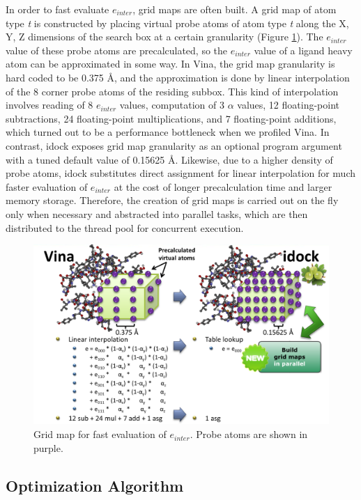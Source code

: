 In order to fast evaluate $e_{inter}$, grid maps are often built. A grid map of atom type \textit{t} is constructed by placing virtual probe atoms of atom type \textit{t} along the X, Y, Z dimensions of the search box at a certain granularity (Figure \ref{idock:GridMap}). The $e_{inter}$ value of these probe atoms are precalculated, so the $e_{inter}$ value of a ligand heavy atom can be approximated in some way. In Vina, the grid map granularity is hard coded to be 0.375 \AA, and the approximation is done by linear interpolation of the 8 corner probe atoms of the residing subbox. This kind of interpolation involves reading of 8 $e_{inter}$ values, computation of 3 $\alpha$ values, 12 floating-point subtractions, 24 floating-point multiplications, and 7 floating-point additions, which turned out to be a performance bottleneck when we profiled Vina. In contrast, idock exposes grid map granularity as an optional program argument with a tuned default value of 0.15625 \AA. Likewise, due to a higher density of probe atoms, idock substitutes direct assignment for linear interpolation for much faster evaluation of $e_{inter}$ at the cost of longer precalculation time and larger memory storage. Therefore, the creation of grid maps is carried out on the fly only when necessary and abstracted into parallel tasks, which are then distributed to the thread pool for concurrent execution.

\begin{figure}
\centering
\includegraphics[width=\linewidth]{idock/GridMap.png}
\caption{Grid map for fast evaluation of $e_{inter}$. Probe atoms are shown in purple.}
\label{idock:GridMap}
\end{figure}

\subsection{Optimization Algorithm}

